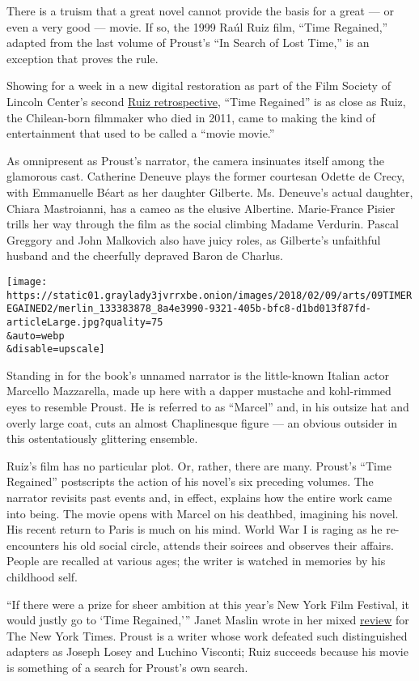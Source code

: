 There is a truism that a great novel cannot provide the basis for a
great --- or even a very good --- movie. If so, the 1999 Raúl Ruiz film,
``Time Regained,'' adapted from the last volume of Proust's ``In Search
of Lost Time,'' is an exception that proves the rule.

Showing for a week in a new digital restoration as part of the Film
Society of Lincoln Center's second
\href{https://www.filmlinc.org/press/fslc-announces-life-dream-films-raul-ruiz-part-2-february-9-18/}{Ruiz
retrospective}, ``Time Regained'' is as close as Ruiz, the Chilean-born
filmmaker who died in 2011, came to making the kind of entertainment
that used to be called a ``movie movie.''

As omnipresent as Proust's narrator, the camera insinuates itself among
the glamorous cast. Catherine Deneuve plays the former courtesan Odette
de Crecy, with Emmanuelle Béart as her daughter Gilberte. Ms. Deneuve's
actual daughter, Chiara Mastroianni, has a cameo as the elusive
Albertine. Marie-France Pisier trills her way through the film as the
social climbing Madame Verdurin. Pascal Greggory and John Malkovich also
have juicy roles, as Gilberte's unfaithful husband and the cheerfully
depraved Baron de Charlus.

\texttt{[image: https://static01.graylady3jvrrxbe.onion/images/2018/02/09/arts/09TIMEREGAINED2/merlin\_133383878\_8a4e3990-9321-405b-bfc8-d1bd013f87fd-articleLarge.jpg?quality=75\\\&auto=webp\\\&disable=upscale]}

Standing in for the book's unnamed narrator is the little-known Italian
actor Marcello Mazzarella, made up here with a dapper mustache and
kohl-rimmed eyes to resemble Proust. He is referred to as ``Marcel''
and, in his outsize hat and overly large coat, cuts an almost
Chaplinesque figure --- an obvious outsider in this ostentatiously
glittering ensemble.

Ruiz's film has no particular plot. Or, rather, there are many. Proust's
``Time Regained'' postscripts the action of his novel's six preceding
volumes. The narrator revisits past events and, in effect, explains how
the entire work came into being. The movie opens with Marcel on his
deathbed, imagining his novel. His recent return to Paris is much on his
mind. World War I is raging as he re-encounters his old social circle,
attends their soirees and observes their affairs. People are recalled at
various ages; the writer is watched in memories by his childhood self.

``If there were a prize for sheer ambition at this year's New York Film
Festival, it would justly go to `Time Regained,''' Janet Maslin wrote in
her mixed
\href{http://www.nytimes3xbfgragh.onion/library/film/093099time-film-review.html}{review}
for The New York Times. Proust is a writer whose work defeated such
distinguished adapters as Joseph Losey and Luchino Visconti; Ruiz
succeeds because his movie is something of a search for Proust's own
search.

